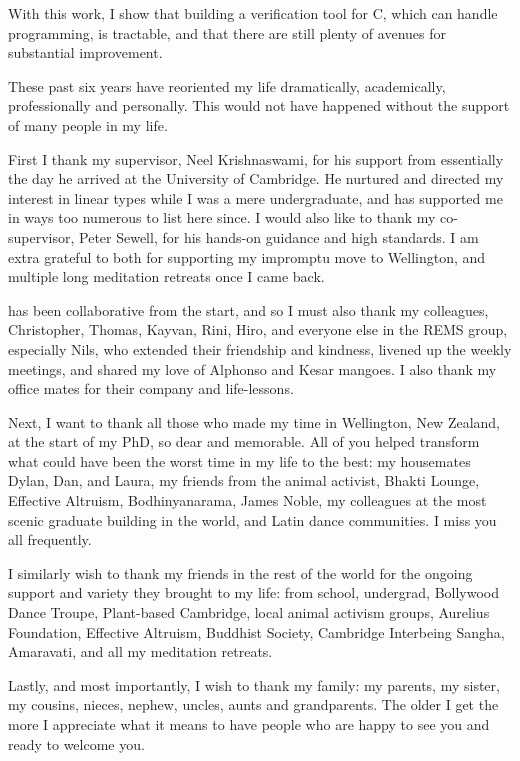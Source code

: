 With this work, I show that building a verification tool for C, which can
handle  programming, is tractable, and that there are still plenty of
avenues for substantial improvement.


These past six years have reoriented my life dramatically, academically,
professionally and personally. This would not have happened without the support
of many people in my life.

First I thank my supervisor, Neel Krishnaswami, for his support from
essentially the day he arrived at the University of Cambridge. He nurtured and
directed my interest in linear types while I was a mere undergraduate, and has
supported me in ways too numerous to list here since. I would also like to
thank my co-supervisor, Peter Sewell, for his hands-on guidance and high
standards. I am extra grateful to both for supporting my impromptu move to
Wellington, and multiple long meditation retreats once I came back.

 has been collaborative from the start, and so I must also thank my
colleagues, Christopher, Thomas, Kayvan, Rini, Hiro, and everyone else
in the REMS group, especially Nils, who extended their friendship and kindness,
livened up the weekly meetings, and shared my love of Alphonso and Kesar mangoes. I also
thank my office mates for their company and life-lessons.

Next, I want to thank all those who made my time in Wellington, New Zealand, at
the start of my PhD, so dear and memorable. All of you helped transform what
could have been the worst time in my life to the best: my housemates Dylan,
Dan, and Laura, my friends from the animal activist, Bhakti Lounge, Effective
Altruism, Bodhinyanarama, James Noble, my colleagues at the most scenic
graduate building in the world, and Latin dance communities. I miss you all
frequently.

I similarly wish to thank my friends in the rest of the world for the ongoing
support and variety they brought to my life: from school, undergrad, Bollywood
Dance Troupe, Plant-based Cambridge, local animal activism groups, Aurelius
Foundation, Effective Altruism, Buddhist Society, Cambridge Interbeing Sangha,
Amaravati, and all my meditation retreats.

Lastly, and most importantly, I wish to thank my family: my parents, my sister,
my cousins, nieces, nephew, uncles, aunts and grandparents. The older I get the
more I appreciate what it means to have people who are happy to see you and
ready to welcome you.

